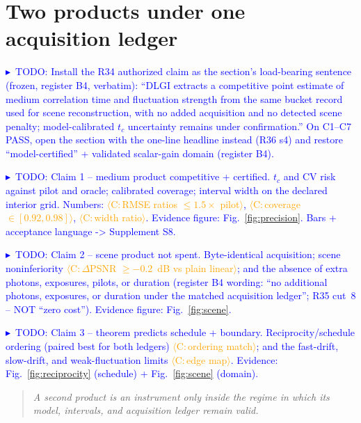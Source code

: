 \documentclass[10pt,twocolumn]{article}
\newcommand{\CAMPAIGN}[1]{\textcolor{orange}{$\langle$C:\,#1$\rangle$}}
\newcommand{\TODOc}[1]{\par\smallskip\noindent\textcolor{blue}{\footnotesize$\blacktriangleright$~TODO: #1}\par\smallskip}
\newcommand{\tc}{t_{c}}
\begin{document}
\section{Two products under one acquisition ledger}
\label{sec:certify}

\TODOc{Install the R34 authorized claim as the section's load-bearing sentence
(frozen, register B4, verbatim): ``DLGI extracts a competitive point estimate of
medium correlation time and fluctuation strength from the same bucket record used
for scene reconstruction, with no added acquisition and no detected scene penalty;
model-calibrated $\tc$ uncertainty remains under confirmation.'' On C1--C7 PASS,
open the section with the one-line headline instead (R36 s4) and restore
``model-certified'' + validated scalar-gain domain (register B4).}

\TODOc{Claim 1 -- medium product competitive + certified. $\tc$ and CV risk
against pilot and oracle; calibrated coverage; interval width on the declared
interior grid. Numbers: \CAMPAIGN{RMSE ratios $\le 1.5\times$ pilot},
\CAMPAIGN{coverage $\in[0.92,0.98]$}, \CAMPAIGN{width ratio}. Evidence figure:
Fig.~\ref{fig:precision}. Bars + acceptance language -> Supplement S8.}

\TODOc{Claim 2 -- scene product not spent. Byte-identical acquisition; scene
noninferiority \CAMPAIGN{$\Delta$PSNR $\ge -0.2$~dB vs plain linear}; and the
absence of extra photons, exposures, pilots, or duration (register B4 wording:
``no additional photons, exposures, or duration under the matched acquisition
ledger''; R35 cut~8 -- NOT ``zero cost''). Evidence figure: Fig.~\ref{fig:scene}.}

\TODOc{Claim 3 -- theorem predicts schedule + boundary. Reciprocity/schedule
ordering (paired best for both ledgers) \CAMPAIGN{ordering match}; and the
fast-drift, slow-drift, and weak-fluctuation limits \CAMPAIGN{edge map}. Evidence:
Fig.~\ref{fig:reciprocity} (schedule) + Fig.~\ref{fig:scene} (domain).}

\begin{quote}\itshape\small
A second product is an instrument only inside the regime in which its model,
intervals, and acquisition ledger remain valid.
\end{quote}
\end{document}

